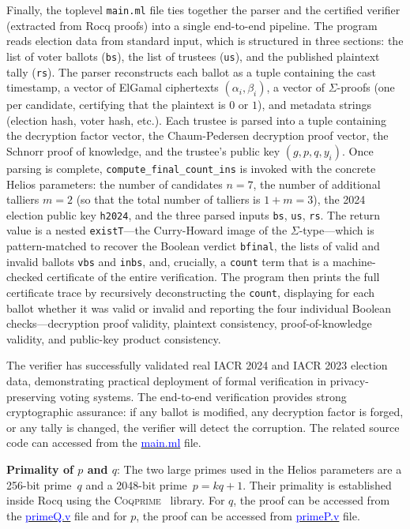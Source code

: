 \documentclass[sigconf, anonymous]{acmart}
\begin{document}
Finally, the toplevel \texttt{main.ml} file ties together the parser
and the certified verifier (extracted from Rocq proofs) into a single end-to-end pipeline.
The program reads election data from standard input, which is structured
in three sections: the list of voter ballots
(\texttt{bs}), the list of trustees (\texttt{us}), and the published
plaintext tally (\texttt{rs}).
The parser reconstructs each ballot as a tuple containing the cast timestamp,
a vector of ElGamal ciphertexts $(\alpha_i, \beta_i)$, a vector of $\Sigma$-proofs (one per candidate, certifying that the plaintext is $0$ or $1$),
and metadata strings (election hash, voter hash, etc.).
Each trustee is parsed into a tuple containing the decryption factor vector,
the Chaum-Pedersen decryption proof vector, the Schnorr proof of knowledge,
and the trustee's public key $(g, p, q, y_i)$. Once parsing is complete, \texttt{compute\_final\_count\_ins} is invoked
with the concrete Helios parameters:
the number of candidates $n = 7$, the number of additional talliers
$m = 2$ (so that the total number of talliers is $1 + m = 3$), the
2024 election public key \texttt{h2024}, and the three parsed inputs
\texttt{bs}, \texttt{us}, \texttt{rs}.
The return value is a nested \texttt{existT}---the Curry-Howard
image of the $\Sigma$-type---which is pattern-matched to recover the
Boolean verdict \texttt{bfinal}, the lists of valid and invalid ballots
\texttt{vbs} and \texttt{inbs}, and, crucially, a \texttt{count} term
that is a machine-checked certificate of the entire verification.
The program then prints the full certificate trace by
recursively deconstructing the \texttt{count}, displaying for
each ballot whether it was valid or invalid and reporting the four individual Boolean checks---decryption proof
validity, plaintext consistency, proof-of-knowledge validity, and public-key product consistency.

The verifier has successfully validated real IACR 2024 and IACR 2023 election data, demonstrating practical deployment 
of formal verification in privacy-preserving voting systems. The end-to-end verification provides strong 
cryptographic assurance: if any ballot is modified, any decryption factor is forged, or any tally is 
changed, the verifier will detect the corruption. The related source code can accessed 
from the \href{https://anonymous.4open.science/r/SigmaProtocol-EBA5/src/Executable/HeliosVerifiercode/main.ml}{\textcolor{blue}{main.ml}} file.


\textbf{Primality of $p$ and $q$}:
The two large primes used in the Helios parameters are a 256-bit prime~$q$
and a 2048-bit prime~$p = kq + 1$.
Their primality is established inside Rocq using the
\textsc{Coqprime}~\cite{thery2007primality} library.  For $q$, the proof can be accessed from the \href{https://anonymous.4open.science/r/SigmaProtocol-EBA5/src/Examples/primeQ.v}{\textcolor{blue}{primeQ.v}} file and 
for $p$, the proof can be accessed from \href{https://anonymous.4open.science/r/SigmaProtocol-EBA5/src/Examples/primeP.v}{\textcolor{blue}{primeP.v}} file.  
\end{document}
